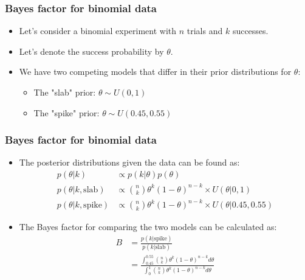 \begin{frame}
\frametitle{Bayes factor for binomial data}

\begin{itemize}
\item Let's consider a binomial experiment with $n$ trials and $k$ successes.
\item Let's denote the success probability by $\theta$.
\item We have two competing models that differ in their prior distributions for $\theta$:
\begin{itemize}
\item The "slab" prior: $\theta \sim U(0, 1)$
\item The "spike" prior: $\theta \sim U(0.45, 0.55)$
\end{itemize}
\end{itemize}

\end{frame}

\begin{frame}
\frametitle{Bayes factor for binomial data}

\begin{itemize}
\item The posterior distributions given the data can be found as:
\begin{align*}
p(\theta|k) &\propto p(k|\theta)p(\theta) \\
p(\theta|k, \text{slab}) &\propto \binom{n}{k} \theta^k (1 - \theta)^{n-k} \times U\left(\theta |0, 1\right) \\
p(\theta|k, \text{spike}) &\propto \binom{n}{k} \theta^k (1 - \theta)^{n-k} \times U\left(\theta |0.45, 0.55\right)
\end{align*}
\item The Bayes factor for comparing the two models can be calculated as:
\begin{align*}
B &= \frac{p(k|\text{spike})}{p(k|\text{slab})} \\
&= \frac{\int_{0.45}^{0.55} \binom{n}{k} \theta^k (1 - \theta)^{n-k} d\theta}{\int_{0}^{1} \binom{n}{k} \theta^k (1 - \theta)^{n-k} d\theta}
\end{align*}
\end{itemize}

\end{frame}
